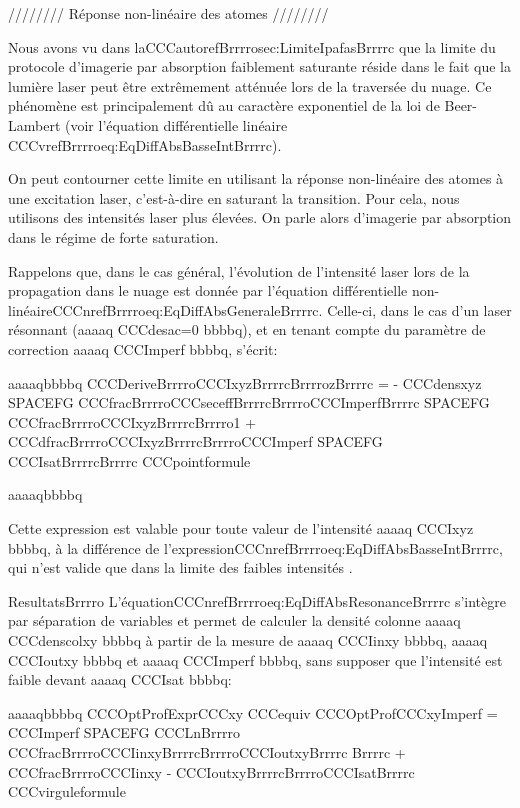 //////// Réponse non-linéaire des atomes ////////

Nous avons vu dans laCCCautorefBrrrrosec:LimiteIpafasBrrrrc que la limite du protocole d'imagerie par absorption faiblement saturante réside dans le fait que la lumière laser peut être extrêmement atténuée lors de la traversée du nuage. Ce phénomène est principalement dû au caractère exponentiel de la loi de Beer-Lambert (voir l'équation différentielle linéaire CCCvrefBrrrroeq:EqDiffAbsBasseIntBrrrrc). 

On peut contourner cette limite en utilisant la réponse non-linéaire des atomes à une excitation laser, c'est-à-dire en saturant la transition. Pour cela, nous utilisons des intensités laser plus élevées. On parle alors d'imagerie par absorption dans le régime de forte saturation. 

Rappelons que, dans le cas général, l'évolution de l'intensité laser lors de la propagation dans le nuage est donnée par l'équation différentielle non-linéaireCCCnrefBrrrroeq:EqDiffAbsGeneraleBrrrrc. Celle-ci, dans le cas d'un laser résonnant (aaaaq CCCdesac=0 bbbbq), et en tenant compte du paramètre de correction aaaaq CCCImperf bbbbq, s'écrit:



aaaaqbbbbq
	CCCDeriveBrrrroCCCIxyzBrrrrcBrrrrozBrrrrc
	= - CCCdensxyz
	 SPACEFG  CCCfracBrrrroCCCseceffBrrrrcBrrrroCCCImperfBrrrrc 
	 SPACEFG  CCCfracBrrrroCCCIxyzBrrrrcBrrrro1 + CCCdfracBrrrroCCCIxyzBrrrrcBrrrroCCCImperf SPACEFG CCCIsatBrrrrcBrrrrc
	CCCpointformule
	
aaaaqbbbbq



Cette expression est valable pour toute valeur de l'intensité aaaaq CCCIxyz bbbbq, à la différence de l'expressionCCCnrefBrrrroeq:EqDiffAbsBasseIntBrrrrc, qui n'est valide que dans la limite des faibles intensités .





ResultatsBrrrro
L'équationCCCnrefBrrrroeq:EqDiffAbsResonanceBrrrrc s'intègre par séparation de variables et permet de calculer la densité colonne aaaaq CCCdenscolxy bbbbq à partir de la mesure de aaaaq CCCIinxy bbbbq, aaaaq CCCIoutxy bbbbq et aaaaq CCCImperf bbbbq, sans supposer que l'intensité est faible devant aaaaq CCCIsat bbbbq:



aaaaqbbbbq
	CCCOptProfExprCCCxy CCCequiv CCCOptProfCCCxyImperf 
	= CCCImperf  SPACEFG  CCCLnBrrrro	CCCfracBrrrroCCCIinxyBrrrrcBrrrroCCCIoutxyBrrrrc	Brrrrc
	+ CCCfracBrrrroCCCIinxy - CCCIoutxyBrrrrcBrrrroCCCIsatBrrrrc
	CCCvirguleformule
	
